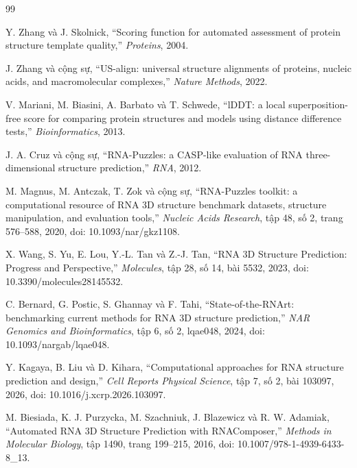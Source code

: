 \documentclass[12pt,a4paper,oneside]{report}
\begin{document}
\begin{thebibliography}{99}

Y. Zhang và J. Skolnick,
``Scoring function for automated assessment of protein structure template quality,''
\emph{Proteins}, 2004.

J. Zhang và cộng sự,
``US-align: universal structure alignments of proteins, nucleic acids, and macromolecular complexes,''
\emph{Nature Methods}, 2022.

V. Mariani, M. Biasini, A. Barbato và T. Schwede,
``lDDT: a local superposition-free score for comparing protein structures and models using distance difference tests,''
\emph{Bioinformatics}, 2013.

J. A. Cruz và cộng sự,
``RNA-Puzzles: a CASP-like evaluation of RNA three-dimensional structure prediction,''
\emph{RNA}, 2012.

M. Magnus, M. Antczak, T. Zok và cộng sự,
``RNA-Puzzles toolkit: a computational resource of RNA 3D structure benchmark datasets,
structure manipulation, and evaluation tools,''
\emph{Nucleic Acids Research}, tập 48, số 2, trang 576--588, 2020,
doi: 10.1093/nar/gkz1108.

X. Wang, S. Yu, E. Lou, Y.-L. Tan và Z.-J. Tan,
``RNA 3D Structure Prediction: Progress and Perspective,''
\emph{Molecules}, tập 28, số 14, bài 5532, 2023,
doi: 10.3390/molecules28145532.

C. Bernard, G. Postic, S. Ghannay và F. Tahi,
``State-of-the-RNArt: benchmarking current methods for RNA 3D structure prediction,''
\emph{NAR Genomics and Bioinformatics}, tập 6, số 2, lqae048, 2024,
doi: 10.1093/nargab/lqae048.

Y. Kagaya, B. Liu và D. Kihara,
``Computational approaches for RNA structure prediction and design,''
\emph{Cell Reports Physical Science}, tập 7, số 2, bài 103097, 2026,
doi: 10.1016/j.xcrp.2026.103097.

M. Biesiada, K. J. Purzycka, M. Szachniuk, J. Blazewicz và R. W. Adamiak,
``Automated RNA 3D Structure Prediction with RNAComposer,''
\emph{Methods in Molecular Biology}, tập 1490, trang 199--215, 2016,
doi: 10.1007/978-1-4939-6433-8\_13.


\end{thebibliography}
\end{document}
